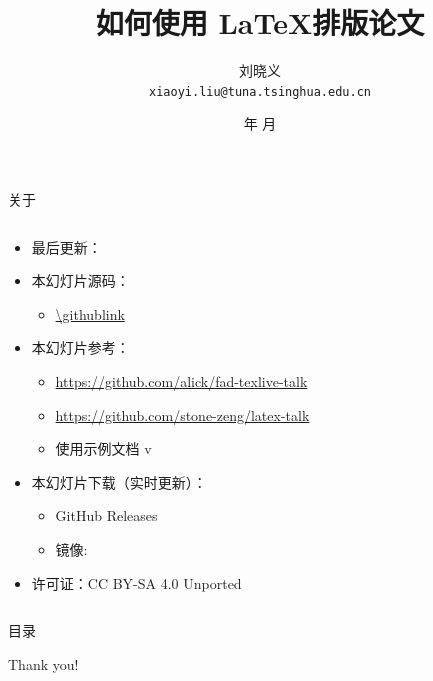\documentclass[xcolor=table,dvipsnames,svgnames,aspectratio=169,fontset=ubuntu]{ctexbeamer}
\title{如何使用 \LaTeX 排版论文}
\author[刘晓义]{\texorpdfstring{\vspace{1em} 刘晓义\\ \texttt{xiaoyi.liu@tuna.tsinghua.edu.cn}}{刘晓义 <xiaoyi.liu@tuna.tsinghua.edu.cn>}}
\institute{清华大学 TUNA 协会}
\date[清华大学图书馆培训讲座]{\the\year 年 \the\month 月}
\let\\\relax
\newcommand\link[1]{\href{#1}{\faLink}}
\begin{document}
\begin{frame}
  \titlepage
\end{frame}


\begin{frame}{关于}
  \begin{columns}[c]
    \begin{column}{.7\textwidth}
      \begin{itemize}
        \item 最后更新：\texttt{\DTMnow}
        \item 本幻灯片源码：
          \begin{itemize}
            \item \url{\githublink}
          \end{itemize}
        \item 本幻灯片参考：
          \begin{itemize}
            \item \url{https://github.com/alick/fad-texlive-talk}
            \item \url{https://github.com/stone-zeng/latex-talk}
            \item \ThuThesis{} 使用示例文档 v\ThuThesisVersion
          \end{itemize}
        \item 本幻灯片下载（实时更新）：
          \begin{itemize}
            \item GitHub Releases \link{\githublink/releases}
            \item 镜像: \thudownloadlink \link{\thudownloadlink}
          \end{itemize}
        \item 许可证：CC BY-SA 4.0 Unported \ccbysa
      \end{itemize}
    \end{column}
    \begin{column}{.3\textwidth}
      \qrcode[hyperlink, height=4cm]{\thudownloadlink}
    \end{column}
  \end{columns}
\end{frame}


\begin{frame}{目录}
  \tableofcontents
\end{frame}







\begin{frame}
  \begin{center}
    {\Huge\calligra Thank you!} %
  \end{center}
\end{frame}
\end{document}
